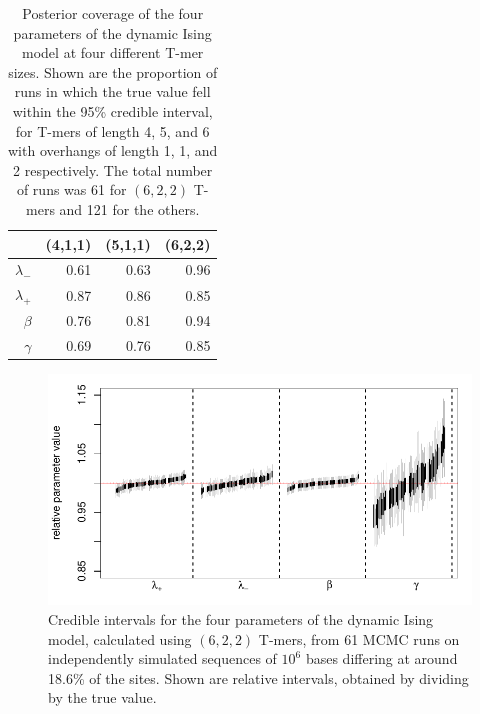 \documentclass{article}
\theoremstyle{plain}
\theoremstyle{definition}
\begin{document}
\begin{table}[ht]
\centering
\begin{tabular}{rrrr}
  \hline
    & (4,1,1) & (5,1,1) & (6,2,2) \\
  \hline
  $\lambda_-$ & 0.61 & 0.63 & 0.96 \\
  $\lambda_+$ & 0.87 & 0.86 & 0.85 \\
  $\beta$     & 0.76 & 0.81 & 0.94 \\
  $\gamma$    & 0.69 & 0.76 & 0.85 \\
   \hline
\end{tabular}
    \caption{
        Posterior coverage of the four parameters of the dynamic Ising model at four different T-mer sizes.
        Shown are the proportion of runs in which the true value fell within the 95\% credible interval,
        for T-mers of length 4, 5, and 6 with overhangs of length 1, 1, and 2 respectively.
        The total number of runs was 61 for $(6,2,2)$ T-mers and 121 for the others.
        \label{tab:ising_coverage}
    }
\end{table}

\begin{figure}
    \begin{center}
        \includegraphics{writeup-plots/coverage_results}
    \end{center}
    \caption{
        Credible intervals for the four parameters of the dynamic Ising model,
        calculated using $(6,2,2)$ T-mers,
        from 61 MCMC runs on independently simulated sequences of $10^6$ bases
        differing at around 18.6\% of the sites.
        Shown are relative intervals, obtained by dividing by the true value.
        \label{fig:ising_coverage}}
\end{figure}
\end{document}
